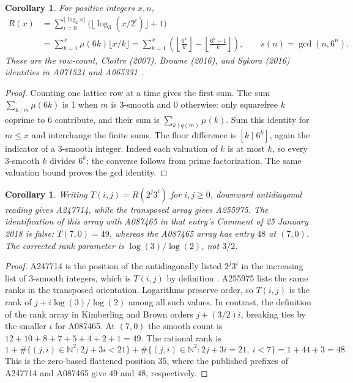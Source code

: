 \documentclass[11pt]{article}
\newtheorem{corollary}[theorem]{Corollary}
\newcommand{\N}{\mathbb N}
\begin{document}
\begin{corollary}\label{elementary}
For positive integers $x,n$,
\begin{align*}
R(x)&=\sum_{i=0}^{\lfloor\log_2x\rfloor}
 \bigl(\lfloor\log_3(x/2^i)\rfloor+1\bigr)\\
&=\sum_{k=1}^x\mu(6k)\lfloor x/k\rfloor
 =\sum_{k=1}^x\left(\left\lfloor\frac{6^k}{k}\right\rfloor
 -\left\lfloor\frac{6^k-1}{k}\right\rfloor\right),
\qquad s(n)=\gcd(n,6^n).
\end{align*}
These are the row-count, Cloitre (2007), Browne (2016), and
Sykora (2016) identities in A071521 and A065331 \cite{count,smoothpart}.
\end{corollary}
\begin{proof}
Counting one lattice row at a time gives the first sum.
The sum $\sum_{k\mid m}\mu(6k)$ is $1$ when $m$ is $3$-smooth
and $0$ otherwise: only squarefree $k$ coprime to $6$ contribute,
and their sum is $\sum_{k\mid q(m)}\mu(k)$.
Sum this identity for $m\leq x$ and interchange the finite sums.
The floor difference is $[k\mid6^k]$, again the indicator of a
$3$-smooth integer. Indeed each valuation of $k$ is at most $k$,
so every $3$-smooth $k$ divides $6^k$; the converse follows from
prime factorization. The same valuation bound proves the gcd identity.
\end{proof}

\begin{corollary}\label{arrays}
Writing $T(i,j)=R(2^j3^i)$ for $i,j\geq0$, downward antidiagonal
reading gives A247714, while the transposed array gives A255975.
The identification of this array with A087465 in that entry's
Comment of 25 January 2018 is false: $T(7,0)=49$, whereas
the A087465 array has entry $48$ at $(7,0)$.
The corrected rank parameter is $\log(3)/\log(2)$, not $3/2$.
\end{corollary}
\begin{proof}
A247714 is the position of the antidiagonally listed $2^j3^i$
in the increasing list of $3$-smooth integers, which is $T(i,j)$
by definition \cite{arrays}. A255975 lists the same ranks in the
transposed orientation. Logarithms preserve order, so $T(i,j)$
is the rank of $j+i\log(3)/\log(2)$ among all such values.
In contrast, the definition of the rank array in Kimberling and Brown
\cite[Section 1]{rankarrays} orders $j+(3/2)i$, breaking ties
by the smaller $i$ for A087465. At $(7,0)$ the smooth count is
$12+10+8+7+5+4+2+1=49$.
The rational rank is
\[
1+\#\{(j,i)\in\N^2:2j+3i<21\}
 +\#\{(j,i)\in\N^2:2j+3i=21,\ i<7\}
=1+44+3=48.
\]
This is the zero-based flattened position $35$, where the published
prefixes of A247714 and A087465 give $49$ and $48$, respectively.
\end{proof}
\end{document}
